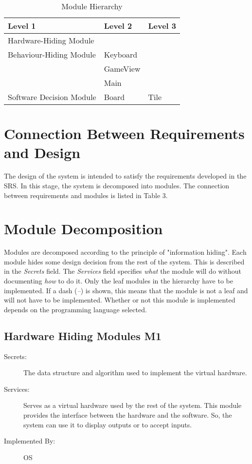 \documentclass[12pt]{article}
\begin{document}
\begin{table}[!htbp]
	\centering
	\begin{tabular}{p{5cm}|p{4cm}|p{4cm}}
		\textbf{Level 1} & \textbf{Level 2} & \textbf{Level 3} \\\hline
		Hardware-Hiding Module & \\\hline
		Behaviour-Hiding Module & Keyboard & \\
		& GameView & \\
		& Main & \\\hline
		Software Decision Module & Board & Tile\\\hline
		
	\end{tabular}
	\smallskip
	\caption{Module Hierarchy}
	\label{Module Hierarchy}	
\end{table}

\section{Connection Between Requirements and Design}
The design of the system is intended to satisfy the requirements developed in the SRS. In this stage, the system is decomposed into modules. The connection between requirements and modules is listed in Table 3.

\section{Module Decomposition}
Modules are decomposed according to the principle of "information hiding". Each module hides some design decision from the rest of the system. This is described in the \textit{Secrets} field. The \textit{Services} field specifies \textit{what} the module will do without documenting \textit{how} to do it. Only the leaf modules in the hierarchy have to be implemented. If a dash (\emph{--}) is shown, this means that the module is not a leaf and will not have to be implemented. Whether or not this module is implemented depends on the programming language selected.

\subsection{Hardware Hiding Modules \textbf{M1}}

\begin{description}
\item[Secrets:]The data structure and algorithm used to implement the virtual
  hardware.
\item[Services:]Serves as a virtual hardware used by the rest of the
  system. This module provides the interface between the hardware and the
  software. So, the system can use it to display outputs or to accept inputs.
\item[Implemented By:] OS
\end{description}
\end{document}
